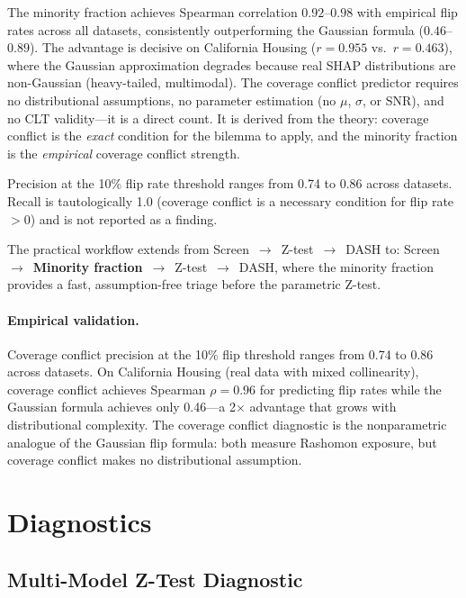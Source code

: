 \documentclass{article}
\begin{document}
The minority fraction achieves Spearman correlation $0.92$--$0.98$ with empirical flip rates across all datasets, consistently outperforming the Gaussian formula ($0.46$--$0.89$).
The advantage is decisive on California Housing ($r = 0.955$ vs.\ $r = 0.463$), where the Gaussian approximation degrades because real SHAP distributions are non-Gaussian (heavy-tailed, multimodal).
The coverage conflict predictor requires no distributional assumptions, no parameter estimation (no $\mu$, $\sigma$, or SNR), and no CLT validity---it is a direct count.
It is derived from the theory: coverage conflict is the \emph{exact} condition for the bilemma to apply, and the minority fraction is the \emph{empirical} coverage conflict strength.

Precision at the 10\% flip rate threshold ranges from 0.74 to 0.86 across datasets.
Recall is tautologically 1.0 (coverage conflict is a necessary condition for flip rate $> 0$) and is not reported as a finding.

The practical workflow extends from Screen~$\to$~Z-test~$\to$~DASH to: Screen~$\to$~\textbf{Minority fraction}~$\to$~Z-test~$\to$~DASH, where the minority fraction provides a fast, assumption-free triage before the parametric Z-test.

\paragraph{Empirical validation.}
Coverage conflict precision at the 10\% flip threshold ranges from 0.74 to 0.86 across datasets. On California Housing (real data with mixed collinearity), coverage conflict achieves Spearman $\rho = 0.96$ for predicting flip rates while the Gaussian formula achieves only 0.46---a 2$\times$ advantage that grows with distributional complexity. The coverage conflict diagnostic is the nonparametric analogue of the Gaussian flip formula: both measure Rashomon exposure, but coverage conflict makes no distributional assumption.


\section{Diagnostics}
\label{sec:diagnostics}

\subsection{Multi-Model Z-Test Diagnostic}
\label{sec:f1}
\end{document}
